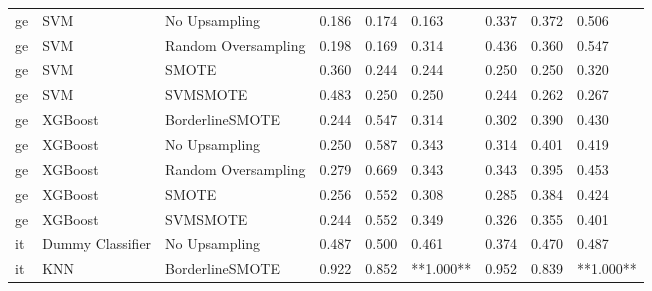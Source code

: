 \begin{tabular}{lllllllll}
      ge &                          SVM &       No Upsampling & 0.186 &                     0.174 &                 0.163 &                  0.337 &                                   0.372 &     0.506 \\
      ge &                          SVM & Random Oversampling & 0.198 &                     0.169 &                 0.314 &                  0.436 &                                   0.360 &     0.547 \\
      ge &                          SVM &               SMOTE & 0.360 &                     0.244 &                 0.244 &                  0.250 &                                   0.250 &     0.320 \\
      ge &                          SVM &            SVMSMOTE & 0.483 &                     0.250 &                 0.250 &                  0.244 &                                   0.262 &     0.267 \\
      ge &                      XGBoost &     BorderlineSMOTE & 0.244 &                     0.547 &                 0.314 &                  0.302 &                                   0.390 &     0.430 \\
      ge &                      XGBoost &       No Upsampling & 0.250 &                     0.587 &                 0.343 &                  0.314 &                                   0.401 &     0.419 \\
      ge &                      XGBoost & Random Oversampling & 0.279 &                     0.669 &                 0.343 &                  0.343 &                                   0.395 &     0.453 \\
      ge &                      XGBoost &               SMOTE & 0.256 &                     0.552 &                 0.308 &                  0.285 &                                   0.384 &     0.424 \\
      ge &                      XGBoost &            SVMSMOTE & 0.244 &                     0.552 &                 0.349 &                  0.326 &                                   0.355 &     0.401 \\
      it &             Dummy Classifier &       No Upsampling & 0.487 &                     0.500 &                 0.461 &                  0.374 &                                   0.470 &     0.487 \\
      it &                          KNN &     BorderlineSMOTE & 0.922 &                     0.852 &             **1.000** &                  0.952 &                                   0.839 & **1.000** \\

\end{tabular}
